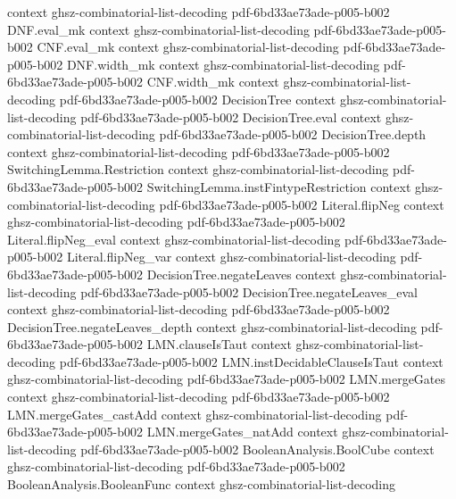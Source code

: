 \begin{lemma}
  {context}
  {ghsz-combinatorial-list-decoding}
  {pdf-6bd33ae73ade-p005-b002}
\proofstep
  {DNF.eval_mk}
  {context}
  {ghsz-combinatorial-list-decoding}
  {pdf-6bd33ae73ade-p005-b002}
\proofstep
  {CNF.eval_mk}
  {context}
  {ghsz-combinatorial-list-decoding}
  {pdf-6bd33ae73ade-p005-b002}
\proofstep
  {DNF.width_mk}
  {context}
  {ghsz-combinatorial-list-decoding}
  {pdf-6bd33ae73ade-p005-b002}
\proofstep
  {CNF.width_mk}
  {context}
  {ghsz-combinatorial-list-decoding}
  {pdf-6bd33ae73ade-p005-b002}
\proofstep
  {DecisionTree}
  {context}
  {ghsz-combinatorial-list-decoding}
  {pdf-6bd33ae73ade-p005-b002}
\proofstep
  {DecisionTree.eval}
  {context}
  {ghsz-combinatorial-list-decoding}
  {pdf-6bd33ae73ade-p005-b002}
\proofstep
  {DecisionTree.depth}
  {context}
  {ghsz-combinatorial-list-decoding}
  {pdf-6bd33ae73ade-p005-b002}
\proofstep
  {SwitchingLemma.Restriction}
  {context}
  {ghsz-combinatorial-list-decoding}
  {pdf-6bd33ae73ade-p005-b002}
\proofstep
  {SwitchingLemma.instFintypeRestriction}
  {context}
  {ghsz-combinatorial-list-decoding}
  {pdf-6bd33ae73ade-p005-b002}
\proofstep
  {Literal.flipNeg}
  {context}
  {ghsz-combinatorial-list-decoding}
  {pdf-6bd33ae73ade-p005-b002}
\proofstep
  {Literal.flipNeg_eval}
  {context}
  {ghsz-combinatorial-list-decoding}
  {pdf-6bd33ae73ade-p005-b002}
\proofstep
  {Literal.flipNeg_var}
  {context}
  {ghsz-combinatorial-list-decoding}
  {pdf-6bd33ae73ade-p005-b002}
\proofstep
  {DecisionTree.negateLeaves}
  {context}
  {ghsz-combinatorial-list-decoding}
  {pdf-6bd33ae73ade-p005-b002}
\proofstep
  {DecisionTree.negateLeaves_eval}
  {context}
  {ghsz-combinatorial-list-decoding}
  {pdf-6bd33ae73ade-p005-b002}
\proofstep
  {DecisionTree.negateLeaves_depth}
  {context}
  {ghsz-combinatorial-list-decoding}
  {pdf-6bd33ae73ade-p005-b002}
\proofstep
  {LMN.clauseIsTaut}
  {context}
  {ghsz-combinatorial-list-decoding}
  {pdf-6bd33ae73ade-p005-b002}
\proofstep
  {LMN.instDecidableClauseIsTaut}
  {context}
  {ghsz-combinatorial-list-decoding}
  {pdf-6bd33ae73ade-p005-b002}
\proofstep
  {LMN.mergeGates}
  {context}
  {ghsz-combinatorial-list-decoding}
  {pdf-6bd33ae73ade-p005-b002}
\proofstep
  {LMN.mergeGates_castAdd}
  {context}
  {ghsz-combinatorial-list-decoding}
  {pdf-6bd33ae73ade-p005-b002}
\proofstep
  {LMN.mergeGates_natAdd}
  {context}
  {ghsz-combinatorial-list-decoding}
  {pdf-6bd33ae73ade-p005-b002}
\proofstep
  {BooleanAnalysis.BoolCube}
  {context}
  {ghsz-combinatorial-list-decoding}
  {pdf-6bd33ae73ade-p005-b002}
\proofstep
  {BooleanAnalysis.BooleanFunc}
  {context}
  {ghsz-combinatorial-list-decoding}

\end{lemma}
